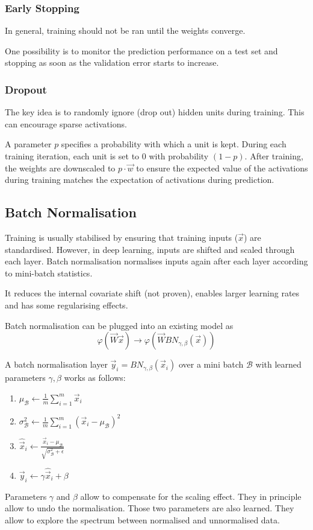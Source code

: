 \subsubsection{Early Stopping}
In general, training should not be ran until the weights converge.

One possibility is to monitor the prediction performance
on a test set and stopping as soon as the validation
error starts to increase.

\subsubsection{Dropout}
The key idea is to randomly ignore (drop out) hidden units
during training.
This can encourage sparse activations.

A parameter $p$ specifies a probability with which a unit
is kept.
During each training iteration, each unit is set to $0$
with probability $(1 - p)$.
After training, the weights are downscaled to
$p \cdot \vec{w}$ to ensure the expected
value of the activations during training matches
the expectation of activations during prediction.


\subsection{Batch Normalisation}
Training is usually stabilised by ensuring that
training inputs ($\vec{x}$) are standardised.
However, in deep learning, inputs are shifted and scaled
through each layer.
Batch normalisation normalises inputs again after each layer
according to mini-batch statistics.

It reduces the internal covariate shift (not proven),
enables larger learning rates and has some regularising effects.

Batch normalisation can be plugged into an existing model as
\begin{equation*}
    \varphi(\vec{W} \vec{x}) \longrightarrow
    \varphi(\vec{W} BN_{\gamma, \beta}(\vec{x}))
\end{equation*}

A batch normalisation layer
$\vec{y}_i = BN_{\gamma, \beta}(\vec{x}_i)$
over a mini batch
$\mathcal{B}$ with learned parameters $\gamma, \beta$
works as follows:
\begin{enumerate}
    \item $\mu_\mathcal{B} \gets \frac{1}{m} \sum_{i=1}^m{\vec{x}_i}$
    \item $\sigma_\mathcal{B}^2 \gets \frac{1}{m} \sum_{i=1}^m{(\vec{x}_i - \mu_\mathcal{B})^2}$
    \item $\hat{\vec{x}}_i \gets \frac{\vec{x}_i - \mu_\mathcal{B}}{\sqrt{\sigma_\mathcal{B}^2 + \epsilon}}$
    \item $\vec{y}_i \gets \gamma \hat{\vec{x}}_i + \beta$
\end{enumerate}
Parameters $\gamma$ and $\beta$ allow to compensate
for the scaling effect.
They in principle allow to undo the normalisation.
Those two parameters are also learned.
They allow to explore the spectrum between normalised
and unnormalised data.


